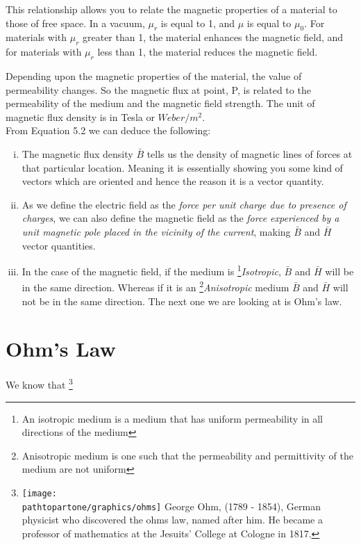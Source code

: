 This relationship allows you to relate the magnetic properties of a material to those of free space. In a vacuum, \( \mu_r \) is equal to 1, and \( \mu \) is equal to \( \mu_0 \). For materials with \( \mu_r \) greater than 1, the material enhances the magnetic field, and for materials with \( \mu_r \) less than 1, the material reduces the magnetic field.

Depending upon the magnetic properties of the material, the value of permeability changes. So the magnetic flux at point, P, is related to the permeability of the medium and the magnetic field strength. The unit of magnetic flux density is in Tesla or $Weber/m^{2}$.\\
From Equation 5.2 we can deduce the following:
\begin{enumerate}[(i)]
	\item The magnetic flux density $\bar{B}$ tells us the density of magnetic lines of forces at that particular location. Meaning it is essentially showing you some kind of vectors which are oriented and hence the reason it is a vector quantity.
	\item As we define the electric field as the \emph{force per unit charge due to presence of charges}, we can also define the magnetic field as the \emph{force experienced by a unit magnetic pole placed in the vicinity of the current}, making $\bar{B}$ and $\bar{H}$ vector quantities.
	\item In the case of the magnetic field, if the medium is \footnote[2]{An isotropic medium is a medium that has uniform permeability in all directions of the medium }\emph{Isotropic}, $\bar{B}$ and $\bar{H}$ will be in the same direction. Whereas if it is an \footnote[3]{Anisotropic medium is one such that the permeability and permittivity of the medium are not uniform }\emph{Anisotropic} medium $\bar{B}$ and $\bar{H}$ will not be in the same direction. The next one we are looking at is Ohm's law.
\end{enumerate}

\section{Ohm's Law} 
We know that 
\footnote[4]{
\texttt{[image: \\pathtopartone/graphics/ohms]} 
George Ohm, (1789 - 1854), German physicist who discovered the ohms law, named after him. He became a professor of mathematics at the Jesuits’ College at Cologne in 1817.
}

